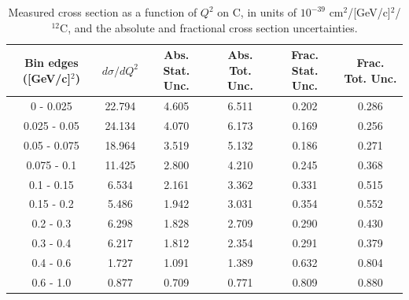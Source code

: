 \documentclass[aps,prl,twocolumn,superscriptaddress,nofootinbib]{revtex4-1}
\begin{document}
\begin{table}[h!]
  \centering
  \caption{Measured cross section as a function of $Q^{2}$ on C, in units of
  $10^{-39}$ $\text{cm}^{2}$/[GeV/c]$^{2}$/$^{12}$C, and the absolute and
  fractional cross section uncertainties.}
    \begin{tabular}{c||c||c|c||c|c}
      Bin edges ([GeV/c]$^{2}$)  &  $d\sigma/dQ^{2}$  &  Abs. Stat. Unc. & Abs. Tot. Unc.  &  Frac. Stat. Unc.  &  Frac. Tot. Unc. \\
      \hline\hline
         0 - 0.025 & 22.794 & 4.605 & 6.511 & 0.202 & 0.286 \\
      0.025 - 0.05 & 24.134 & 4.070 & 6.173 & 0.169 & 0.256 \\
      0.05 - 0.075 & 18.964 & 3.519 & 5.132 & 0.186 & 0.271 \\
       0.075 - 0.1 & 11.425 & 2.800 & 4.210 & 0.245 & 0.368 \\
        0.1 - 0.15 & 6.534 & 2.161 & 3.362 & 0.331 & 0.515 \\
        0.15 - 0.2 & 5.486 & 1.942 & 3.031 & 0.354 & 0.552 \\
         0.2 - 0.3 & 6.298 & 1.828 & 2.709 & 0.290 & 0.430 \\
         0.3 - 0.4 & 6.217 & 1.812 & 2.354 & 0.291 & 0.379 \\
         0.4 - 0.6 & 1.727 & 1.091 & 1.389 & 0.632 & 0.804 \\
         0.6 - 1.0 & 0.877 & 0.709 & 0.771 & 0.809 & 0.880 \\
    \end{tabular}
  \label{table:Q2XSec_C}
\end{table}
\end{document}
